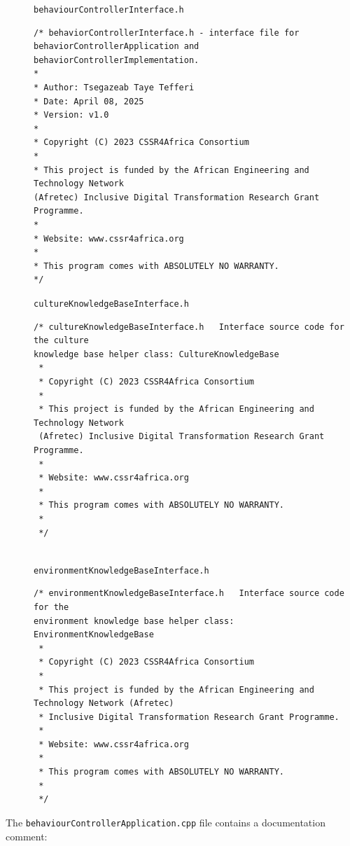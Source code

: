 \documentclass{CSSRforAfrica}
\newcommand{\blank}{~\\}
\newcommand{\checkboxChecked}{\fbox{\ding{51}}} %
\begin{document}
\begin{description}
\item[\checkboxChecked] {\small \verb+behaviourControllerInterface.h+}   
{\small \begin{verbatim}
/* behaviorControllerInterface.h - interface file for 
behaviorControllerApplication and behaviorControllerImplementation.
*
* Author: Tsegazeab Taye Tefferi
* Date: April 08, 2025
* Version: v1.0
*
* Copyright (C) 2023 CSSR4Africa Consortium
*
* This project is funded by the African Engineering and Technology Network 
(Afretec) Inclusive Digital Transformation Research Grant Programme.
*
* Website: www.cssr4africa.org
*
* This program comes with ABSOLUTELY NO WARRANTY.
*/
\end{verbatim} }

\item[\checkboxChecked] {\small \verb+cultureKnowledgeBaseInterface.h+}   
{\small \begin{verbatim}
/* cultureKnowledgeBaseInterface.h   Interface source code for the culture 
knowledge base helper class: CultureKnowledgeBase
 *
 * Copyright (C) 2023 CSSR4Africa Consortium
 *
 * This project is funded by the African Engineering and Technology Network 
 (Afretec) Inclusive Digital Transformation Research Grant Programme.
 *
 * Website: www.cssr4africa.org
 *
 * This program comes with ABSOLUTELY NO WARRANTY.
 *
 */
 
\end{verbatim} }

\item[\checkboxChecked] {\small \verb+environmentKnowledgeBaseInterface.h+}   
{\small \begin{verbatim}
/* environmentKnowledgeBaseInterface.h   Interface source code for the 
environment knowledge base helper class: EnvironmentKnowledgeBase
 *
 * Copyright (C) 2023 CSSR4Africa Consortium
 *
 * This project is funded by the African Engineering and Technology Network (Afretec)
 * Inclusive Digital Transformation Research Grant Programme.
 *
 * Website: www.cssr4africa.org
 *
 * This program comes with ABSOLUTELY NO WARRANTY.
 *
 */
\end{verbatim} }

\end{description} 
%

\noindent The {\small \verb+behaviourControllerApplication.cpp+} file contains a documentation comment:
\end{document}
